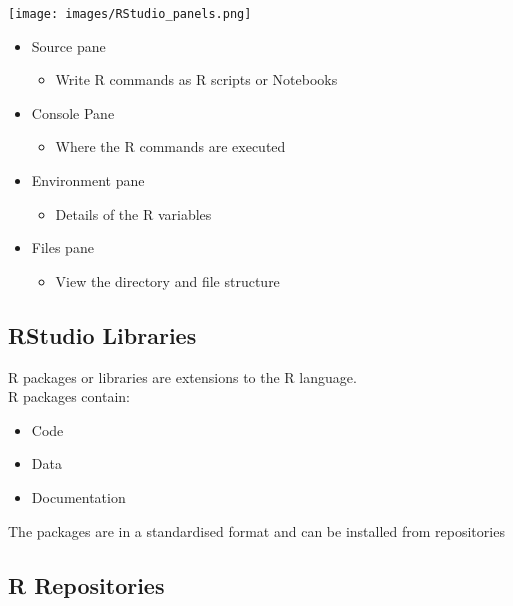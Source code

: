 \documentclass[
  letterpaper,
  DIV=11,
  numbers=noendperiod,
  landscape]{scrartcl}
\providecommand{\tightlist}{%
  \setlength{\itemsep}{0pt}\setlength{\parskip}{0pt}}\usepackage{longtable,booktabs,array}
\begin{document}
\texttt{[image: images/RStudio\_panels.png]}

\begin{itemize}
\tightlist
\item
  {Source pane}

  \begin{itemize}
  \tightlist
  \item
    Write R commands as R scripts or Notebooks\\
  \end{itemize}
\item
  {Console Pane}

  \begin{itemize}
  \tightlist
  \item
    Where the R commands are executed
  \end{itemize}
\item
  {Environment pane}

  \begin{itemize}
  \tightlist
  \item
    Details of the R variables
  \end{itemize}
\item
  {Files pane}

  \begin{itemize}
  \tightlist
  \item
    View the directory and file structure
  \end{itemize}
\end{itemize}

\hypertarget{rstudio-libraries}{%
\subsection{RStudio Libraries}\label{rstudio-libraries}}

R packages or libraries are extensions to the R language.\\
R packages contain:

\begin{itemize}
\tightlist
\item
  Code\\
\item
  Data\\
\item
  Documentation
\end{itemize}

The packages are in a standardised format and can be installed from
repositories

\hypertarget{r-repositories}{%
\subsection{R Repositories}\label{r-repositories}}
\end{document}
